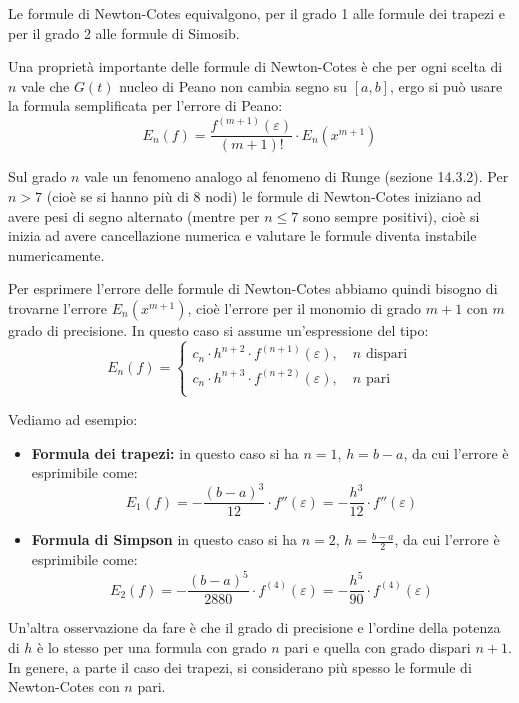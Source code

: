 \documentclass[a4paper,11pt]{article}
\begin{document}
Le formule di Newton-Cotes equivalgono, per il grado 1 alle formule dei trapezi e per il grado 2 alle formule di Simosib.

Una proprietà importante delle formule di Newton-Cotes è che per ogni scelta di $n$ vale che $G(t)$ nucleo di Peano non cambia segno su $[a ,b]$, ergo si può usare la formula semplificata per l'errore di Peano:
$$
E_n(f) = \frac{f^{(m + 1)} (\varepsilon)}{(m + 1)!} \cdot E_n(x^{m + 1})
$$

Sul grado $n$ vale un fenomeno analogo al fenomeno di Runge (sezione 14.3.2).
Per $n > 7$ (cioè se si hanno più di $8$ nodi) le formule di Newton-Cotes iniziano ad avere pesi di segno alternato (mentre per $n \leq 7$ sono sempre positivi), cioè si inizia ad avere cancellazione numerica e valutare le formule diventa instabile numericamente.

\par\smallskip

Per esprimere l'errore delle formule di Newton-Cotes abbiamo quindi bisogno di trovarne l'errore $E_n(x^{m + 1})$, cioè l'errore per il monomio di grado $m + 1$ con $m$ grado di precisione.
In questo caso si assume un'espressione del tipo:
$$
E_n(f) =
\begin{cases}
	c_n \cdot h^{n + 2} \cdot f^{(n + 1)} (\varepsilon), \quad n \text{ dispari} \\			
	c_n \cdot h^{n + 3} \cdot f^{(n + 2)} (\varepsilon), \quad n \text{ pari} \\			
\end{cases}
$$

Vediamo ad esempio:
\begin{itemize}
	\item \textbf{Formula dei trapezi:} in questo caso si ha $n = 1$, $h = b - a$, da cui l'errore è esprimibile come:
		$$
		E_1 (f) = - \frac{(b - a)^3}{12} \cdot f''(\varepsilon) = -\frac{h^3}{12} \cdot f''(\varepsilon)
		$$
	\item \textbf{Formula di Simpson} in questo caso si ha $n = 2$, $h = \frac{b - a}{2}$, da cui l'errore è esprimibile come:
		$$
		E_2 (f) = - \frac{(b - a)^5}{2880} \cdot f^{(4)}(\varepsilon) = -\frac{h^5}{90} \cdot f^{(4)}(\varepsilon)
		$$
\end{itemize}

Un'altra osservazione da fare è che il grado di precisione e l'ordine della potenza di $h$ è lo stesso per una formula con grado $n$ pari e quella con grado dispari $n + 1$.
In genere, a parte il caso dei trapezi, si considerano più spesso le formule di Newton-Cotes con $n$ pari.
\end{document}
